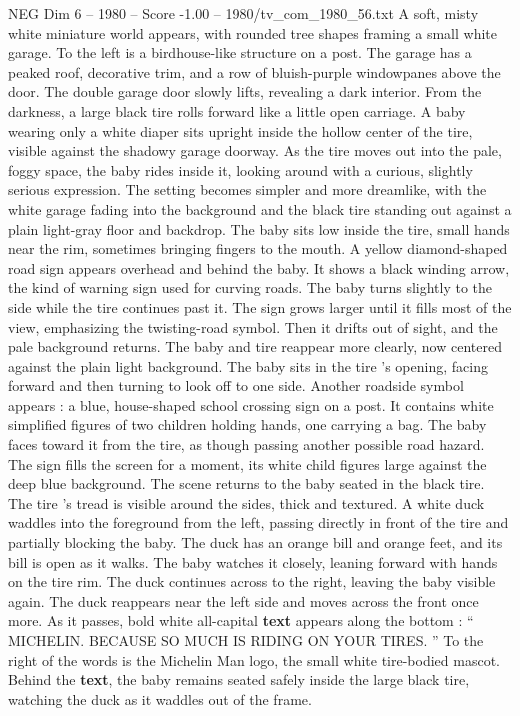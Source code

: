 \begin{textsample}{NEG Dim 6 – 1980 – Score -1.00 – 1980/tv\_com\_1980\_56.txt}  \label{ex:f6_neg_062}
A soft, misty white miniature world appears, with rounded tree shapes framing a small white garage.
To the left is a birdhouse-like structure on a post.
The garage has a peaked roof, decorative trim, and a row of bluish-purple windowpanes above the door.
The double garage door slowly lifts, revealing a dark interior.
From the darkness, a large black tire rolls forward like a little open carriage.
A baby wearing only a white diaper sits upright inside the hollow center of the tire, visible against the shadowy garage doorway.
As the tire moves out into the pale, foggy space, the baby rides inside it, looking around with a curious, slightly serious expression.
The setting becomes simpler and more dreamlike, with the white garage fading into the background and the black tire standing out against a plain light-gray floor and backdrop.
The baby sits low inside the tire, small hands near the rim, sometimes bringing fingers to the mouth.
A yellow diamond-shaped road sign appears overhead and behind the baby.
It shows a black winding arrow, the kind of warning sign used for curving roads.
The baby turns slightly to the side while the tire continues past it.
The sign grows larger until it fills most of the view, emphasizing the twisting-road symbol.
Then it drifts out of sight, and the pale background returns.
The baby and tire reappear more clearly, now centered against the plain light background.
The baby sits in the tire ’s opening, facing forward and then turning to look off to one side.
Another roadside symbol appears : a blue, house-shaped school crossing sign on a post.
It contains white simplified figures of two children holding hands, one carrying a bag.
The baby faces toward it from the tire, as though passing another possible road hazard.
The sign fills the screen for a moment, its white child figures large against the deep blue background.
The scene returns to the baby seated in the black tire.
The tire ’s tread is visible around the sides, thick and textured.
A white duck waddles into the foreground from the left, passing directly in front of the tire and partially blocking the baby.
The duck has an orange bill and orange feet, and its bill is open as it walks.
The baby watches it closely, leaning forward with hands on the tire rim.
The duck continues across to the right, leaving the baby visible again.
The duck reappears near the left side and moves across the front once more.
As it passes, bold white all-capital \textbf{text} appears along the bottom : “ MICHELIN.
BECAUSE SO MUCH IS RIDING ON YOUR TIRES. ” To the right of the words is the Michelin Man logo, the small white tire-bodied mascot.
Behind the \textbf{text}, the baby remains seated safely inside the large black tire, watching the duck as it waddles out of the frame.

\end{textsample}

